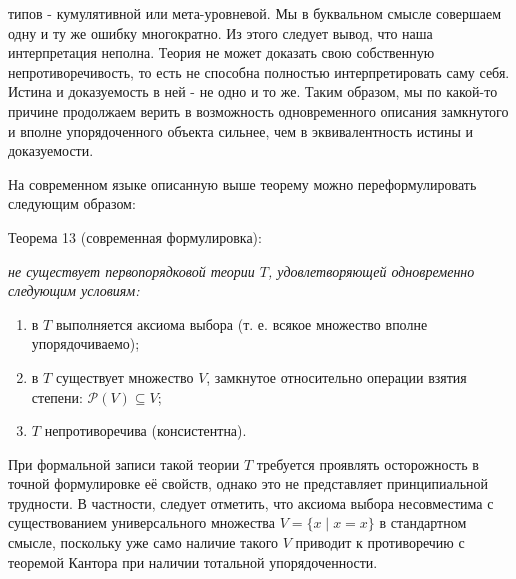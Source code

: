 \documentclass[12pt]{article}
\begin{document}
типов - кумулятивной или мета-уровневой. Мы в буквальном смысле совершаем одну и ту же ошибку многократно. Из этого следует вывод, что наша интерпретация неполна. Теория не может доказать свою собственную непротиворечивость, то есть не способна полностью интерпретировать саму себя. Истина и доказуемость в ней - не одно и то же. Таким образом, мы по какой-то причине продолжаем верить в возможность одновременного описания замкнутого и вполне упорядоченного объекта сильнее, чем в эквивалентность истины и доказуемости.

На современном языке описанную выше теорему можно переформулировать следующим образом:

Теорема 13 (современная формулировка): {\sl не существует первопорядковой теории $T$, удовлетворяющей одновременно следующим условиям:
\begin{enumerate}
    \item в $T$ выполняется аксиома выбора (т. е. всякое множество вполне упорядочиваемо);
    \item в $T$ существует множество $V$, замкнутое относительно операции взятия степени: $\mathcal{P}(V) \subseteq V$;
    \item $T$ непротиворечива (консистентна).
\end{enumerate}}

При формальной записи такой теории $T$ требуется проявлять осторожность в точной формулировке её свойств, однако это не представляет принципиальной трудности. В частности, следует отметить, что аксиома выбора несовместима с существованием универсального множества $V = \{ x \mid x = x \}$ в стандартном смысле, поскольку уже само наличие такого $V$ приводит к противоречию с теоремой Кантора при наличии тотальной упорядоченности.
\end{document}

